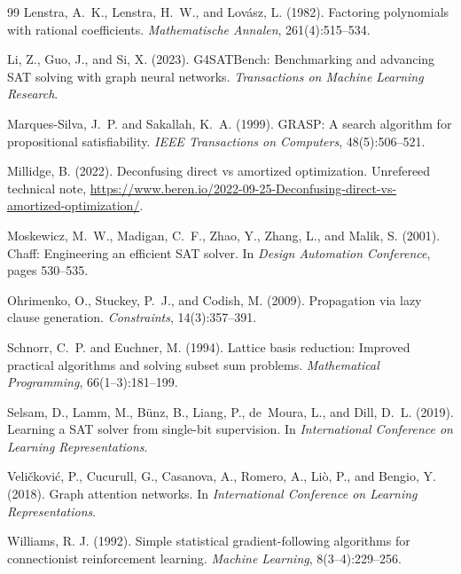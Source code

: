 \documentclass[preprint,12pt]{elsarticle}
\begin{document}
\begin{thebibliography}{99}
Lenstra, A.~K., Lenstra, H.~W., and Lov\'asz, L. (1982).
Factoring polynomials with rational coefficients.
\emph{Mathematische Annalen}, 261(4):515--534.

Li, Z., Guo, J., and Si, X. (2023).
G4SATBench: Benchmarking and advancing SAT solving with graph neural networks.
\emph{Transactions on Machine Learning Research}.

Marques-Silva, J.~P. and Sakallah, K.~A. (1999).
GRASP: A search algorithm for propositional satisfiability.
\emph{IEEE Transactions on Computers}, 48(5):506--521.

Millidge, B. (2022).
Deconfusing direct vs amortized optimization.
Unrefereed technical note, \url{https://www.beren.io/2022-09-25-Deconfusing-direct-vs-amortized-optimization/}.

Moskewicz, M.~W., Madigan, C.~F., Zhao, Y., Zhang, L., and Malik, S. (2001).
Chaff: Engineering an efficient SAT solver.
In \emph{Design Automation Conference}, pages 530--535.

Ohrimenko, O., Stuckey, P.~J., and Codish, M. (2009).
Propagation via lazy clause generation.
\emph{Constraints}, 14(3):357--391.

Schnorr, C.~P. and Euchner, M. (1994).
Lattice basis reduction: Improved practical algorithms and solving subset sum problems.
\emph{Mathematical Programming}, 66(1--3):181--199.

Selsam, D., Lamm, M., B\"unz, B., Liang, P., de~Moura, L., and Dill, D.~L. (2019).
Learning a SAT solver from single-bit supervision.
In \emph{International Conference on Learning Representations}.

Veli\v{c}kovi\'c, P., Cucurull, G., Casanova, A., Romero, A., Li\`o, P., and Bengio, Y. (2018).
Graph attention networks.
In \emph{International Conference on Learning Representations}.

Williams, R. J. (1992).
Simple statistical gradient-following algorithms for connectionist reinforcement learning.
\emph{Machine Learning}, 8(3--4):229--256.


\end{thebibliography}
\end{document}
